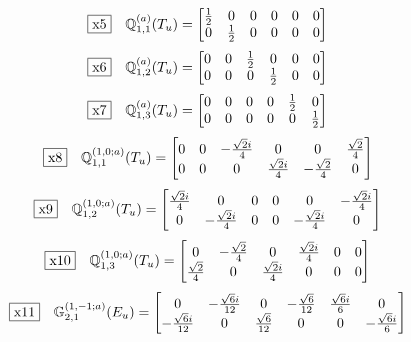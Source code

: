 \documentclass[fleqn,10pt,landscape]{jsarticle}
\begin{document}
\begin{dmath*}
\fbox{x5}\quad \mathbb{Q}_{1,1}^{(a)}(T_{u})=\begin{bmatrix} \frac{1}{2} & 0 & 0 & 0 & 0 & 0 \\ 0 & \frac{1}{2} & 0 & 0 & 0 & 0 \end{bmatrix}
\end{dmath*}
\begin{dmath*}
\fbox{x6}\quad \mathbb{Q}_{1,2}^{(a)}(T_{u})=\begin{bmatrix} 0 & 0 & \frac{1}{2} & 0 & 0 & 0 \\ 0 & 0 & 0 & \frac{1}{2} & 0 & 0 \end{bmatrix}
\end{dmath*}
\begin{dmath*}
\fbox{x7}\quad \mathbb{Q}_{1,3}^{(a)}(T_{u})=\begin{bmatrix} 0 & 0 & 0 & 0 & \frac{1}{2} & 0 \\ 0 & 0 & 0 & 0 & 0 & \frac{1}{2} \end{bmatrix}
\end{dmath*}
\begin{dmath*}
\fbox{x8}\quad \mathbb{Q}_{1,1}^{(1,0;a)}(T_{u})=\begin{bmatrix} 0 & 0 & - \frac{\sqrt{2} i}{4} & 0 & 0 & \frac{\sqrt{2}}{4} \\ 0 & 0 & 0 & \frac{\sqrt{2} i}{4} & - \frac{\sqrt{2}}{4} & 0 \end{bmatrix}
\end{dmath*}
\begin{dmath*}
\fbox{x9}\quad \mathbb{Q}_{1,2}^{(1,0;a)}(T_{u})=\begin{bmatrix} \frac{\sqrt{2} i}{4} & 0 & 0 & 0 & 0 & - \frac{\sqrt{2} i}{4} \\ 0 & - \frac{\sqrt{2} i}{4} & 0 & 0 & - \frac{\sqrt{2} i}{4} & 0 \end{bmatrix}
\end{dmath*}
\begin{dmath*}
\fbox{x10}\quad \mathbb{Q}_{1,3}^{(1,0;a)}(T_{u})=\begin{bmatrix} 0 & - \frac{\sqrt{2}}{4} & 0 & \frac{\sqrt{2} i}{4} & 0 & 0 \\ \frac{\sqrt{2}}{4} & 0 & \frac{\sqrt{2} i}{4} & 0 & 0 & 0 \end{bmatrix}
\end{dmath*}
\begin{dmath*}
\fbox{x11}\quad \mathbb{G}_{2,1}^{(1,-1;a)}(E_{u})=\begin{bmatrix} 0 & - \frac{\sqrt{6} i}{12} & 0 & - \frac{\sqrt{6}}{12} & \frac{\sqrt{6} i}{6} & 0 \\ - \frac{\sqrt{6} i}{12} & 0 & \frac{\sqrt{6}}{12} & 0 & 0 & - \frac{\sqrt{6} i}{6} \end{bmatrix}
\end{dmath*}
\end{document}

